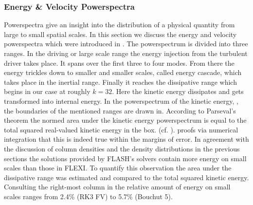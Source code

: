 


\subsubsection{Energy \& Velocity Powerspectra}
\label{sec:stirturb-pws}
Powerspectra give an insight into the distribution of a physical quantity from large to
small spatial scales. In this section we discuss the energy and velocity powerspectra
which were introduced in . The powerspectrum is
divided into three ranges. In the driving or large scale range the energy
injection from the turbulent driver takes place. It spans over the first three
to four modes.  From there the energy trickles down to smaller and smaller
scales, called energy cascade, which takes place in the inertial range. Finally
it reaches the dissipative range which begins in our case at roughly $k = 32$.
Here the kinetic energy dissipates and gets transformed into internal energy.
In the powerspectrum of the kinetic energy,
, the boundaries of the
mentioned ranges are drawn in. According to Parseval's theorem the normed area
under the kinetic energy powerspectrum is equal to the total squared real-valued
kinetic energy in the box. (cf. ).
 proofs via numerical integration
that this is indeed true within the margins of error.  In agreement with the
discussion of column densities and the density distributions in the previous
sections the solutions provided by FLASH's solvers contain more energy on small
scales than those in FLEXI. To quantify this observation the area under the 
dissipative range was estimated and compared to the total squared kinetic energy.
Consulting the right-most column in  the relative amount of
energy on small scales ranges from 2.4\% (RK3 FV) to 5.7\% (Bouchut 5).

